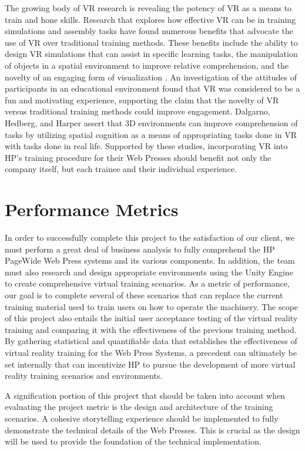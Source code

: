 \documentclass[onecolumn, draftclsnofoot,10pt, compsoc]{IEEEtran}
\begin{document}
The growing body of VR research is revealing the potency of VR as a means to train and hone skills. Research that explores how effective VR can be in training simulations and assembly tasks have found numerous benefits that advocate the use of VR over traditional training methods. These benefits include the ability to design VR simulations that can assist in specific learning tasks, the manipulation of objects in a spatial environment to improve relative comprehension, and the novelty of an engaging form of visualization \cite{1}. An investigation of the attitudes of participants in an educational environment \cite{2} found that VR was considered to be a fun and motivating experience, supporting the claim that the novelty of VR versus traditional training methods could improve engagement. Dalgarno, Hedberg, and Harper \cite{3} assert that 3D environments can improve comprehension of tasks by utilizing spatial cognition as a means of appropriating tasks done in VR with tasks done in real life. Supported by these studies, incorporating VR into HP’s training procedure for their Web Presses should benefit not only the company itself, but each trainee and their individual experience.

\section{Performance Metrics}
In order to successfully complete this project to the satisfaction of our client, we must perform a great deal of business analysis to fully comprehend the HP PageWide Web Press systems and its various components. In addition, the team must also research and design appropriate environments using the Unity Engine to create comprehensive virtual training scenarios. As a metric of performance, our goal is to complete several of these scenarios that can replace the current training material used to train users on how to operate the machinery. The scope of this project also entails the initial user acceptance testing of the virtual reality training and comparing it with the effectiveness of the previous training method. By gathering statistical and quantifiable data that establishes the effectiveness of virtual reality training for the Web Press Systems, a precedent can ultimately be set internally that can incentivize HP to pursue the development of more virtual reality training scenarios and environments. 

A signification portion of this project that should be taken into account when evaluating the project metric is the design and architecture of the training scenarios. A cohesive storytelling experience should be implemented to fully demonstrate the technical details of the Web Presses. This is crucial as the design will be used to provide the foundation of the technical implementation. 
\end{document}
